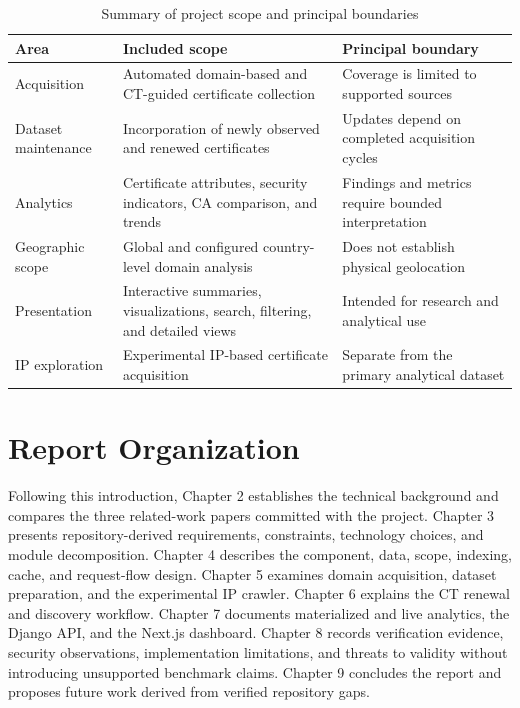 \begin{table}[htbp]
  \centering
  \caption{Summary of project scope and principal boundaries}
  \label{tab:implemented-scope}
  \begin{tabularx}{\textwidth}{@{}>{\RaggedRight\arraybackslash\hyphenpenalty=10000\exhyphenpenalty=10000}p{}>{\RaggedRight\arraybackslash\hyphenpenalty=10000\exhyphenpenalty=10000}X>{\RaggedRight\arraybackslash\hyphenpenalty=10000\exhyphenpenalty=10000}p{}@{}}
    \toprule
    \textbf{Area} & \textbf{Included scope} & \textbf{Principal boundary} \\
    \midrule
    Acquisition & Automated domain-based and CT-guided certificate collection & Coverage is limited to supported sources \\
    Dataset maintenance & Incorporation of newly observed and renewed certificates & Updates depend on completed acquisition cycles \\
    Analytics & Certificate attributes, security indicators, CA comparison, and trends & Findings and metrics require bounded interpretation \\
    Geographic scope & Global and configured country-level domain analysis & Does not establish physical geolocation \\
    Presentation & Interactive summaries, visualizations, search, filtering, and detailed views & Intended for research and analytical use \\
    IP exploration & Experimental IP-based certificate acquisition & Separate from the primary analytical dataset \\
    \bottomrule
  \end{tabularx}
\end{table}

\section{Report Organization}
\label{sec:report-organization}

Following this introduction, Chapter 2 establishes the technical background and compares the three related-work papers committed with the project. Chapter 3 presents repository-derived requirements, constraints, technology choices, and module decomposition. Chapter 4 describes the component, data, scope, indexing, cache, and request-flow design. Chapter 5 examines domain acquisition, dataset preparation, and the experimental IP crawler. Chapter 6 explains the CT renewal and discovery workflow. Chapter 7 documents materialized and live analytics, the Django API, and the Next.js dashboard. Chapter 8 records verification evidence, security observations, implementation limitations, and threats to validity without introducing unsupported benchmark claims. Chapter 9 concludes the report and proposes future work derived from verified repository gaps.
